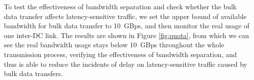 To test the effectiveness of bandwidth separation and check whether the bulk data transfer affects latency-sensitive traffic, we set the upper bound of available bandwidth for bulk data transfer to 10~GBps, and then monitor the real usage of one inter-DC link. The results are shown in Figure \ref{fig:quota}, from which we can see the real bandwidth usage stays below 10~GBps throughout the whole transmission process, verifying the effectiveness of bandwidth separation, and \name thus is able to reduce the incidents of delay on latency-sensitive traffic caused by bulk data transfers.

\begin{table}[t]
\begin{center}
\end{center}
\label{table:usage}
\vspace{-0.4cm}
\end{table}

